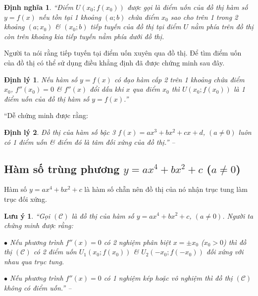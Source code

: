\documentclass[oneside]{book}
\numberwithin{equation}{section}
\newtheorem{dinhnghia}{Định nghĩa}[section]
\newtheorem{luuy}{Lưu ý}[section]
\newtheorem{dinhly}{Định lý}[section]
\begin{document}
\begin{dinhnghia}
	``Điểm $U(x_0;f(x_0))$ được gọi là \emph{điểm uốn} của đồ thị hàm số $y = f(x)$ nếu tồn tại 1 khoảng $(a;b)$ chứa điểm $x_0$ sao cho trên 1 trong 2 khoảng $(a;x_0)$ \& $(x_0;b)$ tiếp tuyến của đồ thị tại điểm $U$ nằm phía trên đồ thị còn trên khoảng kia tiếp tuyến nằm phía dưới đồ thị.
\end{dinhnghia}
Người ta nói rằng tiếp tuyến tại điểm uốn xuyên qua đồ thị. Để tìm điểm uốn của đồ thị có thể sử dụng điều khẳng định đã được chứng minh sau đây.

\begin{dinhly}
	Nếu hàm số $y = f(x)$ có đạo hàm cấp 2 trên 1 khoảng chứa điểm $x_0$, $f''(x_0) = 0$  \& $f''(x)$ đổi dấu khi $x$ qua điểm $x_0$ thì $U(x_0;f(x_0))$ là 1 điểm uốn của đồ thị hàm số $y = f(x)$.''
\end{dinhly}
``Dễ chứng minh được rằng: 

\begin{dinhly}
	Đồ thị của hàm số bậc 3 $f(x) = ax^3 + bx^2 + cx + d$, $(a\ne 0)$ luôn có 1 điểm uốn \& điểm đó là tâm đối xứng của đồ thị.''  -- \cite[p. 39]{SGK_Toan_12_giai_tich_nang_cao}
\end{dinhly}

\subsection{Hàm số trùng phương $y = ax^4 + bx^2 + c$ ($a\ne 0$)}
Hàm số $y = ax^4 + bx^2 + c$ là hàm số chẵn nên đồ thị của nó nhận trục tung làm trục đối xứng.

\begin{luuy}
	``Gọi $(\mathcal{C})$ là đồ thị của hàm số $y = ax^4 + bx^2 + c$, $(a\ne 0)$. Người ta chứng minh được rằng:
	\begin{enumerate*}
		\item[$\bullet$] Nếu phương trình $f''(x) = 0$ có 2 nghiệm phân biệt $x = \pm x_0$ ($x_0 > 0$) thì đồ thị $(\mathcal{C})$ có 2 điểm uốn $U_1(x_0;f(x_0))$ \& $U_2(-x_0;f(-x_0))$ đối xứng với nhau qua trục tung.
		\item[$\bullet$] Nếu phương trình $f''(x) = 0$ có 1 nghiệm kép hoặc vô nghiệm thì đồ thị $(\mathcal{C})$ không có điểm uốn.'' -- \cite[p. 43]{SGK_Toan_12_giai_tich_nang_cao}
	\end{enumerate*}
\end{luuy}

\end{document}

